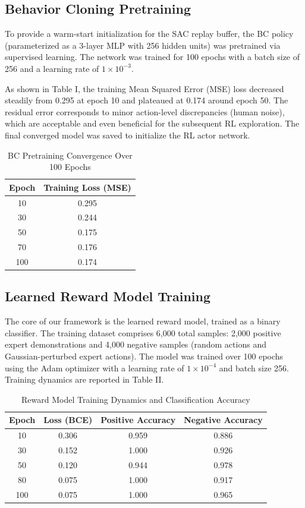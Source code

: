 \documentclass[conference]{IEEEtran}
\begin{document}
\subsection{Behavior Cloning Pretraining}
To provide a warm-start initialization for the SAC replay buffer, the BC policy (parameterized as a 3-layer MLP with 256 hidden units) was pretrained via supervised learning. The network was trained for 100 epochs with a batch size of 256 and a learning rate of  $1 \times 10^{-3}$.

As shown in Table I, the training Mean Squared Error (MSE) loss decreased steadily from 0.295 at epoch 10 and plateaued at 0.174 around epoch 50. The residual error corresponds to minor action-level discrepancies (human noise), which are acceptable and even beneficial for the subsequent RL exploration. The final converged model was saved to initialize the RL actor network.

\begin{table}[h]
  \centering
  \caption{BC Pretraining Convergence Over 100 Epochs}
  \label{tab:bc_convergence}
  \footnotesize                          %
  \begin{tabular}{cc}
    \toprule
    Epoch & Training Loss (MSE) \\
    \midrule
    10 & 0.295 \\
    30 & 0.244 \\
    50 & 0.175 \\
    70 & 0.176 \\
    100 & 0.174 \\
    \bottomrule
  \end{tabular}
\end{table}

\subsection{Learned Reward Model Training}
The core of our framework is the learned reward model, trained as a binary classifier. The training dataset comprises 6,000 total samples: 2,000 positive expert demonstrations and 4,000 negative samples (random actions and Gaussian-perturbed expert actions). The model was trained over 100 epochs using the Adam optimizer with a learning rate of $1 \times 10^{-4}$ and batch size 256. Training dynamics are reported in Table II.

\begin{table}[h]
  \centering
  \caption{Reward Model Training Dynamics and Classification Accuracy}
  \label{tab:reward_model}
  \small
  \begin{tabular}{cccc}
    \toprule
    Epoch & Loss (BCE) & Positive Accuracy & Negative Accuracy \\
    \midrule
    10 & 0.306 & 0.959 & 0.886 \\
    30 & 0.152 & 1.000 & 0.926 \\
    50 & 0.120 & 0.944 & 0.978 \\
    80 & 0.075 & 1.000 & 0.917 \\
    100 & 0.075 & 1.000 & 0.965 \\
    \bottomrule
  \end{tabular}
\end{table}
\end{document}
